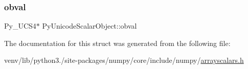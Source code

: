 \mbox{\label{structPyUnicodeScalarObject_a7d420a7a2c357b6313ec47b4f29af53d}} 
\subsubsection{\texorpdfstring{obval}{obval}}
{\footnotesize\ttfamily Py\+\_\+\+U\+C\+S4$\ast$ Py\+Unicode\+Scalar\+Object\+::obval}



The documentation for this struct was generated from the following file\+:\begin{DoxyCompactItemize}
\item 
venv/lib/python3./site-\/packages/numpy/core/include/numpy/\hyperlink{arrayscalars_8h}{arrayscalars.\+h}\end{DoxyCompactItemize}
